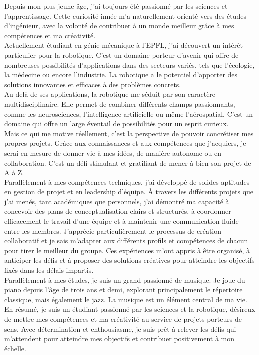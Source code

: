 Depuis mon plus jeune âge, j'ai toujours été passionné par les sciences et l'apprentissage. Cette curiosité 
innée m'a naturellement orienté vers des études d'ingénieur, avec la volonté de contribuer à un monde 
meilleur grâce à mes compétences et ma créativité.\\
Actuellement étudiant en génie mécanique à l'EPFL, j'ai découvert un intérêt particulier pour la 
robotique. C'est un domaine porteur d'avenir qui offre de nombreuses possibilités d'applications dans des 
secteurs variés, tels que l'écologie, la médecine ou encore l'industrie. La robotique a le potentiel d'apporter 
des solutions innovantes et efficaces à des problèmes concrets.\\
Au-delà de ses applications, la robotique me séduit par son caractère multidisciplinaire. Elle permet de combiner différents champs 
passionnants, comme les neurosciences, l'intelligence artificielle ou même l'aérospatial. C'est un domaine qui offre un large éventail de 
possibilités pour un esprit curieux.\\
Mais ce qui me motive réellement, c'est la perspective de pouvoir concrétiser mes propres projets. Grâce aux connaissances et aux compétences 
que j'acquiers, je serai en mesure de donner vie à mes idées, de manière autonome ou en collaboration.
C'est un défi stimulant et gratifiant de mener à bien son projet de A à Z.\\
Parallèlement à mes compétences techniques, j'ai développé de solides aptitudes en gestion de projet et en leadership d'équipe. À travers les différents projets que j'ai menés, tant académiques que personnels, j'ai démontré ma capacité à concevoir des plans de conceptualisation clairs et structurés, à coordonner efficacement le travail d'une équipe et à maintenir une communication fluide entre les membres. J'apprécie particulièrement le processus de création collaboratif et je sais m'adapter aux différents profils et 
compétences de chacun pour tirer le meilleur du groupe. 
Ces expériences m'ont appris à être organisé, à anticiper les défis et 
à proposer des solutions créatives pour atteindre les objectifs 
fixés dans les délais impartis.\\
Parallèlement à mes études, je suis un grand passionné de musique. Je joue du piano depuis l'âge de trois ans et demi, 
explorant principalement le répertoire classique, mais également le jazz. La musique est un élément central de ma vie.\\
En résumé, je suis un étudiant passionné par les sciences et la robotique, désireux de mettre mes compétences et ma créativité au 
service de projets porteurs de sens. Avec détermination et enthousiasme, je suis prêt à relever les défis qui m'attendent pour atteindre mes 
objectifs et contribuer positivement à mon échelle.

